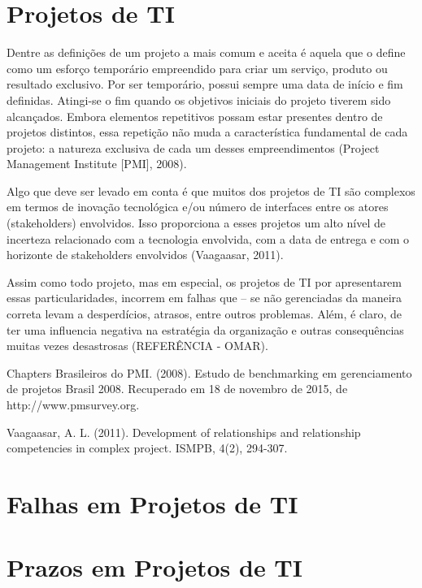   \section{Projetos de TI}

    Dentre as definições de um projeto a mais comum e aceita é aquela que o define como um esforço temporário empreendido para criar um serviço, produto ou resultado exclusivo. Por ser temporário, possui sempre uma data de início e fim definidas. Atingi-se o fim quando os objetivos iniciais do projeto tiverem sido alcançados. Embora elementos repetitivos possam estar presentes dentro de projetos distintos, essa repetição não muda a característica fundamental de cada projeto: a natureza exclusiva de cada um desses empreendimentos (Project Management Institute [PMI], 2008).

    Algo que deve ser levado em conta é que muitos dos projetos de TI são complexos em termos de inovação tecnológica e/ou número de interfaces entre os atores (stakeholders) envolvidos. Isso proporciona a esses projetos um alto nível de incerteza relacionado com a tecnologia envolvida, com a data de entrega e com o horizonte de stakeholders envolvidos (Vaagaasar, 2011).

    Assim como todo projeto, mas em especial, os projetos de TI por apresentarem essas particularidades, incorrem em falhas que – se não gerenciadas da maneira correta levam a desperdícios, atrasos, entre outros problemas. Além, é claro, de ter uma influencia negativa na estratégia da organização e outras consequências muitas vezes desastrosas (REFERÊNCIA - OMAR).

    Chapters Brasileiros do PMI. (2008). Estudo de benchmarking em gerenciamento de projetos Brasil 2008. Recuperado em 18 de novembro de 2015, de http://www.pmsurvey.org.

    Vaagaasar, A. L. (2011). Development of relationships and relationship competencies in complex project. ISMPB, 4(2), 294-307.

  \section{Falhas em Projetos de TI}

  \section{Prazos em Projetos de TI}






